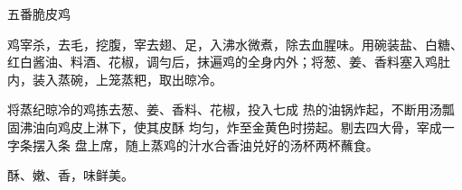 \begin{recipe}{五番脆皮鸡}

\ingredients


\cooking

\step 鸡宰杀，去毛，挖腹，宰去翅、足，入沸水微煮，除去血腥味。用碗装盐、白糖、红白酱油、料酒、花椒，调勻后，抹遍鸡的全身内外；将葱、姜、香料塞入鸡肚内，装入蒸碗，上笼蒸粑，取出晾冷。

将蒸纪晾冷的鸡拣去葱、姜、香料、花椒，投入七成 热的油锅炸起，不断用汤瓢固沸油向鸡皮上淋下，使其皮酥 均匀，炸至金黄色时捞起。剔去四大骨，宰成一字条摆入条 盘上席，随上蒸鸡的汁水合香油兑好的汤杯两杯蘸食。

\notes

酥、嫩、香，味鲜美。

\end{recipe}

